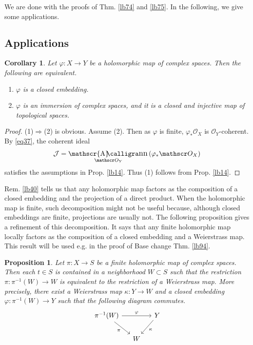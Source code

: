 \documentclass[12pt,b5paper,notitlepage]{report}
\theoremstyle{definition}
\theoremstyle{plain}
\newtheorem{pp}[df]{Proposition}
\newtheorem{co}[df]{Corollary}
\DeclareMathOperator{\sann}{\mathscr{A}\text{\kern -3pt {\calligra\large nn}}\,}
\newcommand{\mc}{\mathcal}
\newcommand{\scr}{\mathscr}
\numberwithin{equation}{section}
\begin{document}
We are done with the proofs of Thm. \ref{lb74} and \ref{lb75}. In the following, we give some applications.


\subsection{Applications}


\begin{co}\label{lb84}
Let $\varphi:X\rightarrow Y$ be a holomorphic map of complex spaces. Then the following are equivalent.
\begin{enumerate}[label=(\arabic*)]
\item $\varphi$ is a closed embedding.
\item $\varphi$ is an immersion of complex spaces, and it is a closed and injective map of topological spaces.
\end{enumerate}
\end{co}

\begin{proof}
(1)$\Rightarrow$(2) is obvious. Assume (2). Then as $\varphi$ is finite, $\varphi_*\scr O_X$ is $\scr O_Y$-coherent. By \eqref{eq37}, the coherent ideal
\begin{align*}
\mc J=\sann_{\scr O_Y}(\varphi_*\scr O_X)
\end{align*}
satisfies the assumptions in Prop. \ref{lb14}. Thus (1) follows from Prop. \ref{lb14}.
\end{proof}



Rem. \ref{lb40} tells us that any holomorphic map factors as the composition of a closed embedding and the projection of a direct product. When the holomorphic map is finite, such decomposition might not be useful because, although closed embeddings are finite, projections are usually not. The following proposition gives a refinement of this decomposition. It says that any finite holomorphic map locally factors as the composition of a closed embedding and a Weierstrass map. This result will be used e.g. in the proof of Base change Thm. \ref{lb94}.


\begin{pp}\label{lb89}
Let $\pi:X\rightarrow S$ be a finite holomorphic map of complex spaces. Then each $t\in S$ is contained in a neighborhood $W\subset S$ such that the restriction $\pi:\pi^{-1}(W)\rightarrow W$ is equivalent to the restriction of a Weierstrass map. More precisely, there exist a Weierstrass map $\kappa:Y\rightarrow W$ and a closed embedding $\varphi:\pi^{-1}(W)\rightarrow Y$ such that the following diagram commutes.
\begin{equation}
\begin{tikzcd}[column sep=small]
\pi^{-1}(W) \arrow[rd,"\pi"'] \arrow[rr,"\varphi"] &   & Y \arrow[ld,"\kappa"] \\
                        & W &             
\end{tikzcd}
\end{equation} 
\end{pp}
\end{document}
